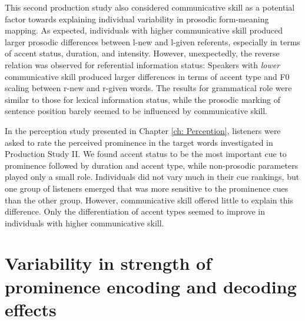 This second production study also considered communicative skill as a potential factor towards explaining individual variability in prosodic form-meaning mapping. As expected, individuals with higher communicative skill produced larger prosodic differences between l-new and l-given referents, especially in terms of accent status, duration, and intensity. However, unexpectedly, the reverse relation was observed for referential information status: Speakers with \textit{lower} communicative skill produced larger differences in terms of accent type and F0 scaling between r-new and r-given words. The results for grammatical role were similar to those for lexical information status, while the prosodic marking of sentence position barely seemed to be influenced by communicative skill.

In the perception study presented in Chapter \ref{ch: Perception}, listeners were asked to rate the perceived prominence in the target words investigated in Production Study II. We found accent status to be the most important cue to prominence followed by duration and accent type, while non-prosodic parameters played only a small role. Individuals did not vary much in their cue rankings, but one group of listeners emerged that was more sensitive to the prominence cues than the other group. However, communicative skill offered little to explain this difference. Only the differentiation of accent types seemed to improve in individuals with higher communicative skill.

\section{Variability in strength of prominence encoding and decoding effects}

